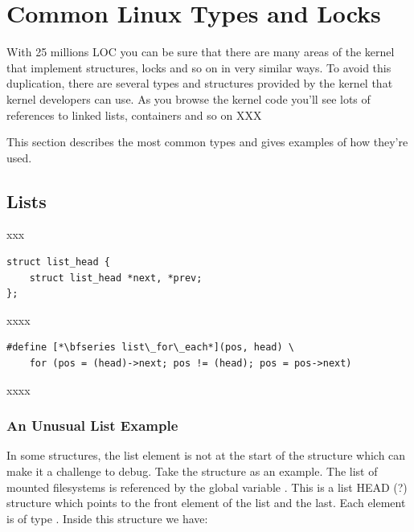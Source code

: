 \chapter{Common Linux Types and Locks}

With 25 millions LOC you can be sure that there are many areas of the kernel that implement structures, locks and so on in very similar ways. To avoid this duplication, there are several types and structures provided by the kernel that kernel developers can use. As you browse the kernel code you'll see lots of references to linked lists, containers and so on XXX

This section describes the most common types and gives examples of how they're used.



\section{Lists}

xxx

\begin{lstlisting}
struct list_head {
    struct list_head *next, *prev;
};
\end{lstlisting}

\noindent
xxxx

\begin{lstlisting}
#define [*\bfseries list\_for\_each*](pos, head) \ 
    for (pos = (head)->next; pos != (head); pos = pos->next)
\end{lstlisting}

\noindent
xxxx



\subsection{An Unusual List Example}

In some structures, the list element is not at the start of the structure which can make it a challenge to debug. Take the  structure as an example. The list of mounted filesystems is referenced by the global variable . This is a list HEAD (?) structure which points to the front element of the list and the last. Each element is of type . Inside this structure we have:

